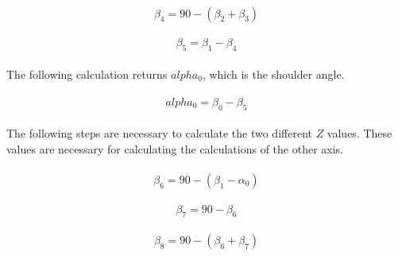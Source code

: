 \documentclass{article}
\begin{document}
    \paragraph{}
    \begin{equation}
        \beta_4 = 90 - (\beta_2 + \beta_3)
    \end{equation}

    \paragraph{}
    \begin{equation}
        \beta_5 = \beta_1 - \beta_4
    \end{equation}

    \paragraph{}
    The following calculation returns $alpha_0$, which is the shoulder angle. 

    \paragraph{}
    \begin{equation}
        alpha_0 = \beta_0 - \beta_5
    \end{equation}

    \paragraph{}
    The following steps are necessary to calculate the two different $Z$ values. These values are necessary for calculating the calculations of the other axis.

    \paragraph{}
    \begin{equation}
        \beta_6 = 90 - (\beta_1 - \alpha_0)
    \end{equation}

    \paragraph{}
    \begin{equation}
        \beta_7 = 90 - \beta_6
    \end{equation}

    \paragraph{}
    \begin{equation}
        \beta_8 = 90 - (\beta_6 + \beta_7)
    \end{equation}
\end{document}
